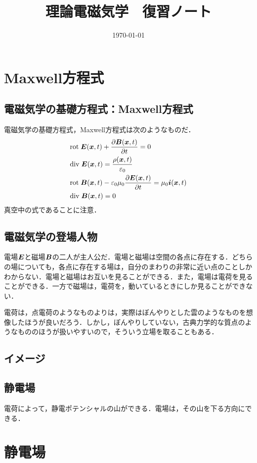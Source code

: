 \documentclass[a4paper,10pt,uplatex]{jsarticle}
\newcommand{\rot}{\mathrm{rot}\;}
\renewcommand{\div}{\mathrm{div}\;}
\newcommand{\E}{\vb*{E}}
\newcommand{\B}{\vb*{B}}
\newcommand{\x}{\vb*{x}}
\renewcommand{\i}{\vb*{i}}
\begin{document}
\title{理論電磁気学　復習ノート}
\author{}
\date{\today}
\maketitle

\section{Maxwell方程式}
\subsection{電磁気学の基礎方程式：Maxwell方程式}
電磁気学の基礎方程式，Maxwell方程式は次のようなものだ．
\begin{align}
    &\rot \E(\x,t) + \pdv{\B(\x,t)}{t} = 0 \\
    &\div \E(\x,t) = \frac{\rho(\x, t)}{\varepsilon_0} \\
    &\rot \B(\x,t) - \varepsilon_0\mu_0\pdv{\E(\x,t)}{t} = \mu_0\i(\x,t) \\
    &\div \B(\x,t) = 0
\end{align}
真空中の式であることに注意．

\subsection{電磁気学の登場人物}
電場$\E$と磁場$\B$の二人が主人公だ．電場と磁場は空間の各点に存在する．どちらの場についても，各点に存在する場は，自分のまわりの非常に近い点のことしかわからない．電場と磁場はお互いを見ることができる．また，電場は電荷を見ることができる．一方で磁場は，電荷を，動いているときにしか見ることができない．%

電荷は，点電荷のようなものよりは，実際はぼんやりとした雲のようなものを想像したほうが良いだろう．しかし，ぼんやりしていない，古典力学的な質点のようなもののほうが扱いやすいので，そういう立場を取ることもある．

\subsection{イメージ}
\subsection{静電場}
電荷によって，静電ポテンシャルの山ができる．電場は，その山を下る方向にできる．

\section{静電場}
\end{document}
